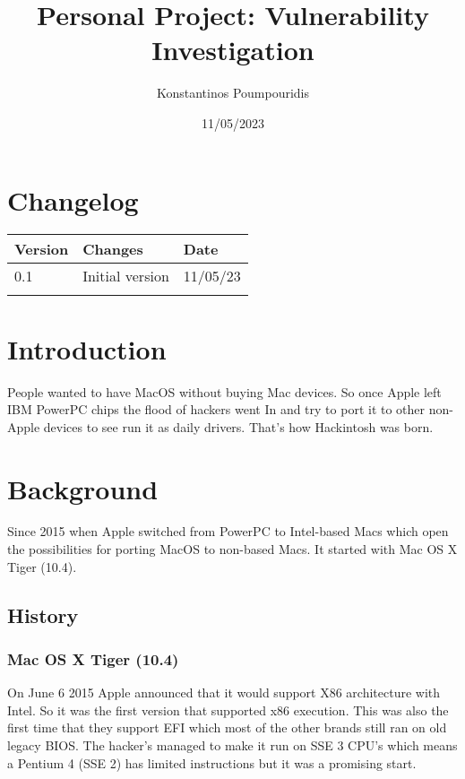 \documentclass[12pt, letterpaper]{article}
\title{Personal Project: Vulnerability Investigation}
\author{Konstantinos Poumpouridis}
\date{11/05/2023}
\newcommand{\titlepicture}[2][]{%
  \renewcommand\placetitlepicture{%
    \texttt{[image: \#2]}\par\medskip
  }%
}
\newcommand{\placetitlepicture}{} %
\begin{document}
\titlepicture[width=0.6\textwidth]{fotos/PSP/Hackintosh title.jpeg}
\maketitle
\thispagestyle{empty}
\newpage
\section{Changelog}
    \begin{table}[htbp]
        \begin{tabular}{|l|l|l|}
            \hline
            Version & Changes         & Date   \tabularnewline \hline
            0.1     & Initial version & 11/05/23 \tabularnewline \hline
\tabularnewline \hline
        \end{tabular}
    \end{table}
\newpage
\tableofcontents
\newpage

\section{Introduction}
People wanted to have MacOS without buying Mac devices. So once Apple left IBM PowerPC chips the flood of hackers went In and try to port it to other non-Apple devices to see run it as daily drivers. That's how Hackintosh was born.

\section{Background}
Since 2015 when Apple switched from PowerPC to Intel-based Macs which open the possibilities for porting MacOS to non-based Macs. It started with Mac OS X Tiger (10.4).

\subsection{History}
 

\subsubsection{Mac OS X Tiger (10.4)}
On June 6 2015 Apple announced that it would support X86 architecture with Intel. So it was the first version that supported x86 execution. This was also the first time that they support EFI which most of the other brands still ran on old legacy BIOS. The hacker's managed to make it run on SSE 3 CPU's which means a Pentium 4 (SSE 2) has limited instructions but it was a promising start.
\end{document}
